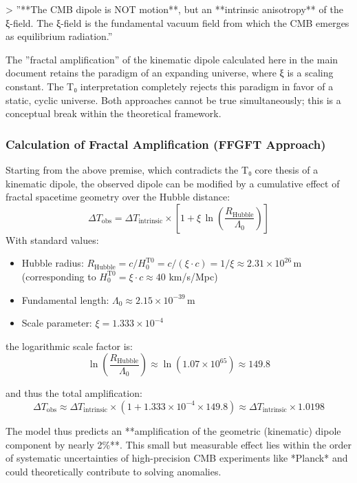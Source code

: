 \documentclass[12pt,a4paper]{article}
\begin{document}
	> ''**The CMB dipole is NOT motion**, but an **intrinsic anisotropy** of the ξ-field. The ξ-field is the fundamental vacuum field from which the CMB emerges as equilibrium radiation.''
	
	The ''fractal amplification'' of the kinematic dipole calculated here in the main document retains the paradigm of an expanding universe, where ξ is a scaling constant. The T₀ interpretation completely rejects this paradigm in favor of a static, cyclic universe. Both approaches cannot be true simultaneously; this is a conceptual break within the theoretical framework.
	
	\subsubsection*{Calculation of Fractal Amplification (FFGFT Approach)}
	
	Starting from the above premise, which contradicts the T₀ core thesis of a kinematic dipole, the observed dipole can be modified by a cumulative effect of fractal spacetime geometry over the Hubble distance:
	\[
	\Delta T_{\text{obs}} = \Delta T_{\text{intrinsic}} \times \left[1 + \xi \, \ln\left(\frac{R_{\text{Hubble}}}{\Lambda_0}\right)\right]
	\]
	With standard values:
	\begin{itemize}
		\item Hubble radius: $R_{\text{Hubble}} = c/H_0^{\text{T0}} = c/(\xi \cdot c) = 1/\xi \approx 2.31 \times 10^{26} \, \text{m}$ (corresponding to $H_0^{\text{T0}} = \xi \cdot c \approx 40$ km/s/Mpc)
		\item Fundamental length: $\Lambda_0 \approx 2.15 \times 10^{-39} \, \text{m}$
		\item Scale parameter: $\xi = 1.333 \times 10^{-4}$
	\end{itemize}
	
	the logarithmic scale factor is:
	\[
	\ln\left(\frac{R_{\text{Hubble}}}{\Lambda_0}\right) \approx \ln(1.07 \times 10^{65}) \approx 149.8
	\]
	
	and thus the total amplification:
	\[
	\Delta T_{\text{obs}} \approx \Delta T_{\text{intrinsic}} \times (1 + 1.333\times10^{-4} \times 149.8) \approx \Delta T_{\text{intrinsic}} \times 1.0198
	\]
	
	The model thus predicts an **amplification of the geometric (kinematic) dipole component by nearly 2\%**. This small but measurable effect lies within the order of systematic uncertainties of high-precision CMB experiments like *Planck* and could theoretically contribute to solving anomalies.
	
\end{document}
